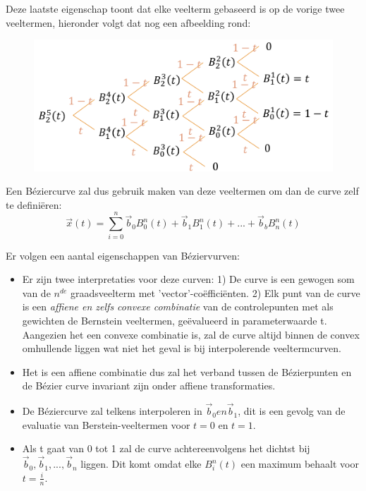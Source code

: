 \documentclass[12pt,a4paper]{article}
\begin{document}
\begin{itemize}
\begin{figure}[H]
			\label{fig:eigenschap7}
		\end{figure}
		Deze laatste eigenschap toont dat elke veelterm gebaseerd is op de vorige twee veeltermen, hieronder volgt dat nog een afbeelding rond: 
		\begin{figure}[H]
			\centering
			\includegraphics[width=0.7\linewidth]{afbeeldingen/Beziercurven/recursiebetrekking}
			\label{fig:recursiebetrekking}
		\end{figure}
	\end{itemize}
	Een Béziercurve zal dus gebruik maken van deze veeltermen om dan de curve zelf te definiëren: 
	\[\overrightarrow{x}(t) = \sum_{i = 0}^{n}\overrightarrow{b}_0B_0^n(t) + \vec{b}_1B_1^n(t) + ... + \overrightarrow{b}_bB_n^n(t)\]	
	
	Er volgen een aantal eigenschappen van Béziervurven: 
	\begin{itemize}
		\item Er zijn twee interpretaties voor deze curven: 1) De curve is een gewogen som van de $n^{de}$ graadsveelterm met 'vector'-coëfficiënten. 2) Elk punt van de curve is een \textit{affiene en zelfs convexe combinatie} van de controlepunten met als gewichten de Bernstein veeltermen, geëvalueerd in parameterwaarde t. Aangezien het een convexe combinatie is, zal de curve altijd binnen de convex omhullende liggen wat niet het geval is bij interpolerende veeltermcurven. 
		\item Het is een affiene combinatie dus zal het verband tussen de Bézierpunten en de Bézier curve invariant zijn onder affiene transformaties. 
		\item De Béziercurve zal telkens interpoleren in $\vec{b}_0 en \vec{b}_1$, dit is een gevolg van de evaluatie van Berstein-veeltermen voor $t=0$ en $t=1$. 
		\item Als t gaat van 0 tot 1 zal de curve achtereenvolgens het dichtst bij $\vec{b}_0, \vec{b}_1, ..., \vec{b}_n$ liggen. Dit komt omdat elke $B_i^n(t)$ een maximum behaalt voor $t = \tfrac{i}{n}$. 
	\end{itemize}
	
\end{document}
